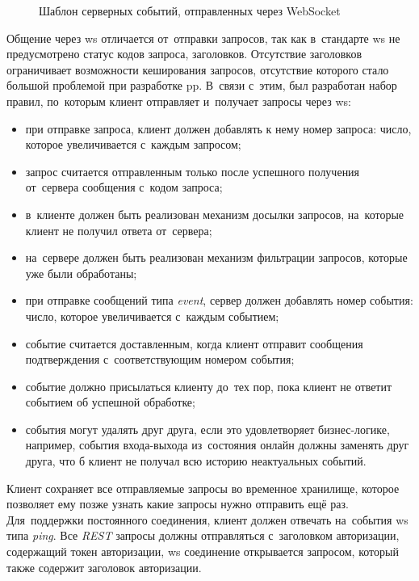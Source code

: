 \begin{figure}[h]
	
   \caption{Шаблон серверных событий, отправленных через WebSocket}
   \label{sec:development:arch:pp:communication:code:ws:response}
\end{figure}

Общение через \gls{ws} отличается от~отправки запросов, так как в~стандарте \gls{ws} не предусмотрено статус кодов запроса, заголовков. Отсутствие заголовков ограничивает возможности кеширования запросов, отсутствие которого стало большой проблемой при разработке \gls{pp}. В~связи с~этим, был разработан набор правил, по~которым клиент отправляет и~получает запросы через \gls{ws}:

\begin{itemize}
	\item при отправке запроса, клиент должен добавлять к нему номер запроса: число, которое увеличивается с~каждым запросом;
	\item запрос считается отправленным только после успешного получения от~сервера сообщения с~кодом запроса;
	\item в~клиенте должен быть реализован механизм досылки запросов, на~которые клиент не получил ответа от~сервера;
	\item на~сервере должен быть реализован механизм фильтрации запросов, которые уже были обработаны;
	\item при отправке сообщений типа \textit{event}, сервер должен добавлять номер события: число, которое увеличивается с~каждым событием;
	\item событие считается доставленным, когда клиент отправит сообщения подтверждения с~соответствующим номером события;
	\item событие должно присылаться клиенту до~тех пор, пока клиент не ответит событием об успешной обработке;
	\item события могут удалять друг друга, если это удовлетворяет бизнес-логике, например, события входа-выхода из~состояния онлайн должны заменять друг друга, что б клиент не получал всю историю неактуальных событий.
\end{itemize}

Клиент сохраняет все отправляемые запросы во временное хранилище, которое позволяет ему позже узнать какие запросы нужно отправить ещё раз. Для~поддержки постоянного соединения, клиент должен отвечать на~события \gls{ws} типа \textit{ping}. Все \textit{REST} запросы должны отправляться с~заголовком авторизации, содержащий токен авторизации, \gls{ws} соединение открывается запросом, который также содержит заголовок авторизации.